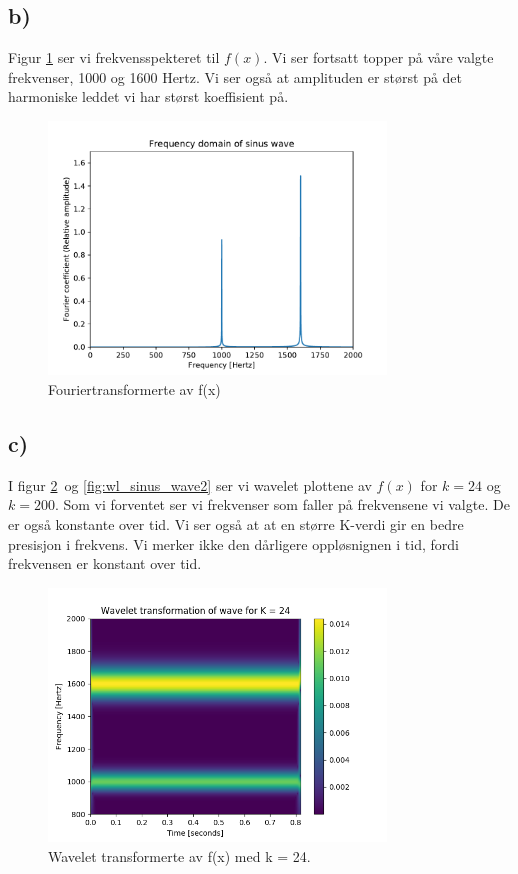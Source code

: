 \documentclass[11pt,norsk]{article}
\begin{document}
\subsection*{b)}
Figur \ref{fig:FT_sinus_wave} ser vi frekvensspekteret til $f(x)$. Vi ser fortsatt topper på våre valgte frekvenser, 1000 og 1600 Hertz. Vi ser også at amplituden er størst på det harmoniske leddet vi har størst koeffisient på.
\begin{figure}[H]
\centering
\includegraphics[width=0.8\textwidth]{fig/FT_sinus_wave.pdf}
\caption{Fouriertransformerte av f(x)}
\label{fig:FT_sinus_wave}
\end{figure}



\subsection*{c)}
I figur \ref{fig:wl_sinus_wave1} og \ref{fig:wl_sinus_wave2} ser vi wavelet plottene av $f(x)$ for $k=24$ og $k=200$. Som vi forventet ser vi frekvenser som faller på frekvensene vi valgte. De er også konstante over tid. Vi ser også at at en større K-verdi gir en bedre presisjon i frekvens. Vi merker ikke den dårligere oppløsnignen i tid, fordi frekvensen er konstant over tid.
\begin{figure}[H]
\centering
\includegraphics[width=0.8\textwidth]{fig/wavelet_sinus_k=24.png}
\caption{Wavelet transformerte av f(x) med k = 24.}
\label{fig:wl_sinus_wave1}
\end{figure}
\end{document}
